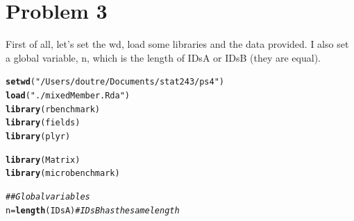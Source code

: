 \documentclass{llncs}\usepackage[]{graphicx}\usepackage[]{color}
\makeatletter
\newcommand{\hlstr}[1]{\textcolor[rgb]{0.192,0.494,0.8}{#1}}%
\newcommand{\hlcom}[1]{\textcolor[rgb]{0.678,0.584,0.686}{\textit{#1}}}%
\newcommand{\hlstd}[1]{\textcolor[rgb]{0.345,0.345,0.345}{#1}}%
\newcommand{\hlkwb}[1]{\textcolor[rgb]{0.69,0.353,0.396}{#1}}%
\newcommand{\hlkwd}[1]{\textcolor[rgb]{0.737,0.353,0.396}{\textbf{#1}}}%
\newenvironment{kframe}{%
 \def\at@end@of@kframe{}%
 \ifinner\ifhmode%
  \def\at@end@of@kframe{\end{minipage}}%
  \begin{minipage}{\columnwidth}%
 \fi\fi%
 \def\FrameCommand##1{\hskip\@totalleftmargin \hskip-\fboxsep
 \colorbox{shadecolor}{##1}\hskip-\fboxsep
     \hskip-\linewidth \hskip-\@totalleftmargin \hskip\columnwidth}%
 \MakeFramed {\advance\hsize-\width
   \@totalleftmargin\z@ \linewidth\hsize
   \@setminipage}}%
 {\par\unskip\endMakeFramed%
 \at@end@of@kframe}
\newenvironment{knitrout}{}{} %
\makeatother
\begin{document}
\section{Problem 3}
\noindent
First of all, let's set the wd, load some libraries and the data provided. I also set a global variable, n, which is the length of IDsA or IDsB (they are equal).
\begin{knitrout}
\color{fgcolor}\begin{kframe}
\begin{alltt}
\hlkwd{setwd}\hlstd{(}\hlstr{"/Users/doutre/Documents/stat243/ps4"}\hlstd{)}
\hlkwd{load}\hlstd{(}\hlstr{"./mixedMember.Rda"}\hlstd{)}
\hlkwd{library}\hlstd{(rbenchmark)}
\hlkwd{library}\hlstd{(fields)}
\hlkwd{library}\hlstd{(plyr)}
\end{alltt}


{\ttfamily\noindent\itshape\color{messagecolor}{\#\# \\\#\# Attaching package: 'plyr'\\\#\# \\\#\# The following object is masked from 'package:fields':\\\#\# \\\#\#\ \ \ \  ozone\\\#\# \\\#\# The following object is masked from 'package:maps':\\\#\# \\\#\#\ \ \ \  ozone}}\begin{alltt}
\hlkwd{library}\hlstd{(Matrix)}
\hlkwd{library}\hlstd{(microbenchmark)}

\hlcom{## Global variables}
\hlstd{n}\hlkwb{=}\hlkwd{length}\hlstd{(IDsA)} \hlcom{#IDsB has the same length}
\end{alltt}
\end{kframe}
\end{knitrout}
\end{document}
